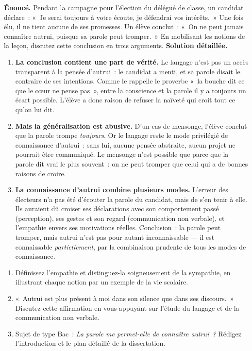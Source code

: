 \documentclass[11pt]{article}
\begin{document}
\begin{exoresolu}
\textbf{\'Enonc\'e.} Pendant la campagne pour l'\'election du d\'el\'egu\'e de classe, un candidat d\'eclare~: «~Je serai toujours \`a votre \'ecoute, je d\'efendrai vos int\'er\^ets.~» Une fois \'elu, il ne tient aucune de ses promesses. Un \'el\`eve conclut~: «~On ne peut jamais conna\^itre autrui, puisque sa parole peut tromper.~» En mobilisant les notions de la le\c con, discutez cette conclusion en trois arguments.
\tcblower
\textbf{Solution d\'etaill\'ee.}
\begin{enumerate}
\item \textbf{La conclusion contient une part de v\'erit\'e.} Le langage n'est pas un acc\`es transparent \`a la pens\'ee d'autrui~: le candidat a menti, et sa parole disait le contraire de ses intentions. Comme le rappelle le proverbe «~la bouche dit ce que le c\oe ur ne pense pas~», entre la conscience et la parole il y a toujours un \'ecart possible. L'\'el\`eve a donc raison de refuser la na\"ivet\'e qui croit tout ce qu'on lui dit.
\item \textbf{Mais la g\'en\'eralisation est abusive.} D'un cas de mensonge, l'\'el\`eve conclut que la parole trompe \emph{toujours}. Or le langage reste le mode privil\'egi\'e de connaissance d'autrui~: sans lui, aucune pens\'ee abstraite, aucun projet ne pourrait \^etre communiqu\'e. Le mensonge n'est possible que parce que la parole dit vrai le plus souvent~: on ne peut tromper que celui qui a de bonnes raisons de croire.
\item \textbf{La connaissance d'autrui combine plusieurs modes.} L'erreur des \'electeurs n'a pas \'et\'e d'\'ecouter la parole du candidat, mais de s'en tenir \`a elle. Ils auraient d\^u croiser ses d\'eclarations avec son comportement pass\'e (perception), ses gestes et son regard (communication non verbale), et l'empathie envers ses motivations r\'eelles. Conclusion~: la parole peut tromper, mais autrui n'est pas pour autant inconnaissable --- il est connaissable \emph{partiellement}, par la combinaison prudente de tous les modes de connaissance.
\end{enumerate}
\end{exoresolu}

\begin{exercice}
\begin{enumerate}
\item D\'efinissez l'empathie et distinguez-la soigneusement de la sympathie, en illustrant chaque notion par un exemple de la vie scolaire.
\item «~Autrui est plus pr\'esent \`a moi dans son silence que dans ses discours.~» Discutez cette affirmation en vous appuyant sur l'\'etude du langage et de la communication non verbale.
\item Sujet de type Bac~: \emph{La parole me permet-elle de conna\^itre autrui~?} R\'edigez l'introduction et le plan d\'etaill\'e de la dissertation.
\end{enumerate}
\end{exercice}
\end{document}

